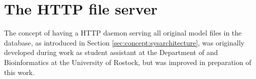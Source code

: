 
\section{The HTTP file server}
\label{sec:concept:filestorage}

The concept of having a HTTP daemon serving all original model files in the \masymos database, as introduced in Section \ref{sec:concept:sysarchitecture}, was originally developed during work as student assistant at the Department of \sysbio and Bioinformatics at the University of Rostock, but was improved in preparation of this work.

